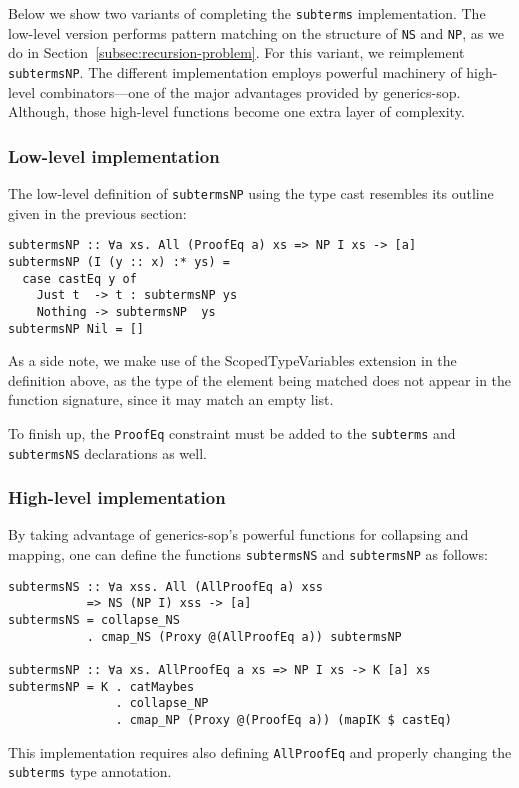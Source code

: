 \documentclass[runningheads]{llncs}
\newcommand{\K}[1]{\lstinline[style=fancy]{#1}}
\begin{document}
Below we show two variants of completing the \K{subterms} implementation. The low-level version performs pattern matching on the structure of \K{NS} and \K{NP}, as we do in Section~\ref{subsec:recursion-problem}. For this variant, we reimplement \K{subtermsNP}. The different implementation employs powerful machinery of high-level combinators---one of the major advantages provided by \textsf{generics-sop}. Although, those high-level functions become one extra layer of complexity.

\subsubsection{Low-level implementation}

The low-level definition of \K{subtermsNP} using the type cast resembles its outline given in the previous section:
\begin{lstlisting}[style=fancy]
subtermsNP :: ∀a xs. All (ProofEq a) xs => NP I xs -> [a]
subtermsNP (I (y :: x) :* ys) =
  case castEq y of
    Just t  -> t : subtermsNP ys
    Nothing -> subtermsNP  ys
subtermsNP Nil = []
\end{lstlisting}

As a side note, we make use of the \textsf{ScopedTypeVariables} extension in the definition above, as the type of the element being matched does not appear in the function signature, since it may match an empty list. 

To finish up, the \K{ProofEq} constraint must be added to the \K{subterms} and \K{subtermsNS} declarations as well.

\subsubsection{High-level implementation}

By taking advantage of \textsf{generics-sop}'s powerful functions for collapsing and mapping, one can define the functions \K{subtermsNS} and \K{subtermsNP} as follows:
\begin{lstlisting}[style=fancy]
subtermsNS :: ∀a xss. All (AllProofEq a) xss
           => NS (NP I) xss -> [a]
subtermsNS = collapse_NS
           . cmap_NS (Proxy @(AllProofEq a)) subtermsNP

subtermsNP :: ∀a xs. AllProofEq a xs => NP I xs -> K [a] xs
subtermsNP = K . catMaybes
               . collapse_NP
               . cmap_NP (Proxy @(ProofEq a)) (mapIK $ castEq)
\end{lstlisting}
This implementation requires also defining \K{AllProofEq} and properly changing the \K{subterms} type annotation.
\end{document}
